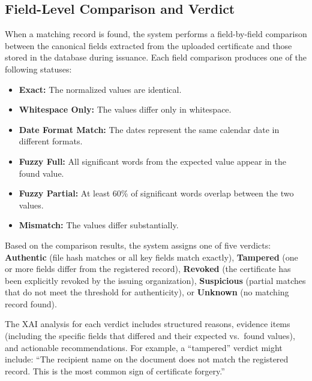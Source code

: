         \subsection{Field-Level Comparison and Verdict}
        \label{sec:comparison_verdict}
        
        When a matching record is found, the system performs a field-by-field comparison between the canonical fields extracted from the uploaded certificate and those stored in the database during issuance. Each field comparison produces one of the following statuses:
        
        \begin{itemize}
            \item \textbf{Exact:} The normalized values are identical.
        
            \item \textbf{Whitespace Only:} The values differ only in whitespace.
        
            \item \textbf{Date Format Match:} The dates represent the same calendar date in different formats.
        
            \item \textbf{Fuzzy Full:} All significant words from the expected value appear in the found value.
        
            \item \textbf{Fuzzy Partial:} At least 60\% of significant words overlap between the two values.
        
            \item \textbf{Mismatch:} The values differ substantially.
        \end{itemize}
        
        Based on the comparison results, the system assigns one of five verdicts: \textbf{Authentic} (file hash matches or all key fields match exactly), \textbf{Tampered} (one or more fields differ from the registered record), \textbf{Revoked} (the certificate has been explicitly revoked by the issuing organization), \textbf{Suspicious} (partial matches that do not meet the threshold for authenticity), or \textbf{Unknown} (no matching record found).
        
        The XAI analysis for each verdict includes structured reasons, evidence items (including the specific fields that differed and their expected vs.\ found values), and actionable recommendations. For example, a ``tampered'' verdict might include: ``The recipient name on the document does not match the registered record. This is the most common sign of certificate forgery.''

